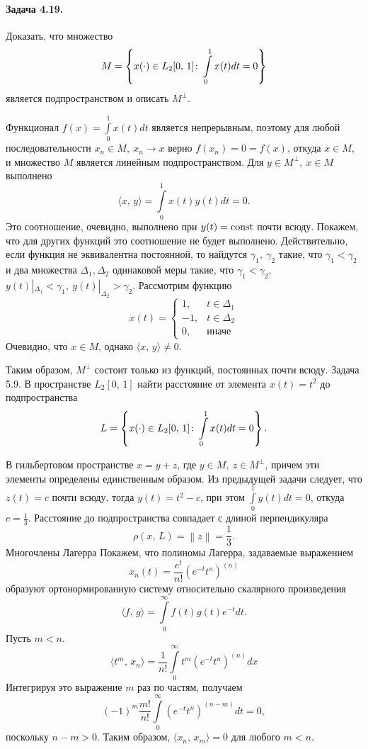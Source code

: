 \documentclass[16pt]{article}
\newenvironment{Sol}{\par\noindent{\it Решение:}}
\newcommand\A{(\cdot)}
\newcommand\Scal[2]{\langle #1,\, #2 \rangle}
\newcommand\Norm[1]{\left\| #1 \right\|}
\newcommand\Int[2]{\int\limits_{#1}^{#2}}
\begin{document}
\paragraph{Задача 4.19.}
Доказать, что множество 
$$M = \left\{x\A \in L_2[0,\,1]\colon \Int{0}{1}x(t)dt = 0\right\}$$
является подпространством и описать $M^\bot$.

\begin{Sol}
Функционал $f(x) = \Int{0}{1}x(t)dt$ является непрерывным, поэтому для любой последовательности $x_n \in M,\ x_n \to x$ верно $f(x_n) = 0 = f(x)$, откуда $x \in M$, и множество $M$ является линейным подпространством.
Для $y \in M^\bot, \ x \in M$ выполнено
$$\Scal{x}{y} = \Int{0}{1}x(t)y(t)dt = 0.$$
Это соотношение, очевидно, выполнено при $y(t) = \rm{const}$ почти всюду. Покажем, что для других функций это соотношение
не будет выполнено. Действительно, если функция не эквивалентна постоянной, то найдутся $\gamma_1,\ \gamma_2$ такие, что $\gamma_1 < \gamma_2$ и два множества
$\Delta_1, \Delta_2$ одинаковой меры такие, что $\gamma_1 < \gamma_2$, \ $y(t)|_{\Delta_1} < \gamma_1,\
y(t)|_{\Delta_2} > \gamma_2$. Рассмотрим функцию
$$ x(t) = 
\begin{cases}
1, & t \in \Delta_1\\
-1, & t \in \Delta_2\\
0, & \text{иначе}
\end{cases}
$$
Очевидно, что $x \in M$, однако $\Scal{x}{y} \not= 0$.

Таким образом, $M^\bot$ состоит только из функций, постоянных почти всюду.
\end{Sol}

\paragraph{Задача 5.9.}
В пространстве $L_2[0,\,1]$ найти расстояние от элемента $x(t) = t^2$ до подпространства
$$L = \left\{x\A \in L_2[0,\,1]\colon \Int{0}{1}x(t)dt = 0\right\}.$$

\begin{Sol}
В гильбертовом пространстве $x = y + z$, где $y \in M,\ z \in M^\bot$, причем эти элементы определены 
единственным образом. Из предыдущей задачи следует, что $z(t) = c$ почти всюду, тогда $y(t) = t^2 - c$, при
этом $\Int{0}{1}y(t)dt = 0$, откуда $c = \frac{1}{3}$. Расстояние до подпространства совпадает с длиной перпендикуляра
$$\rho(x, \, L) = \Norm{z} = \frac{1}{3}.$$ 
\end{Sol}

\paragraph{Многочлены Лагерра} Покажем, что полиномы Лагерра, задаваемые выражением
$$x_n(t) = \frac{e^t}{n!}(e^{-t}t^n)^{(n)}$$ 
образуют ортонормированную систему относительно скалярного произведения 
$$\Scal{f}{g} = \Int{0}{\infty}f(t)g(t)e^{-t}dt.$$
Пусть $m < n$.
$$\Scal{t^m}{x_n} = \frac{1}{n!}\Int{0}{\infty}t^m(e^{-t}t^n)^{(n)}dx$$
Интегрируя это выражение $m$ раз по частям, получаем
$$(-1)^m\frac{m!}{n!}\Int{0}{\infty}(e^{-t}t^n)^{(n-m)}dt = 0,$$
поскольку $n - m > 0$. Таким образом, $\Scal{x_n}{x_m} = 0$ для любого $m < n$.   
\end{document}
